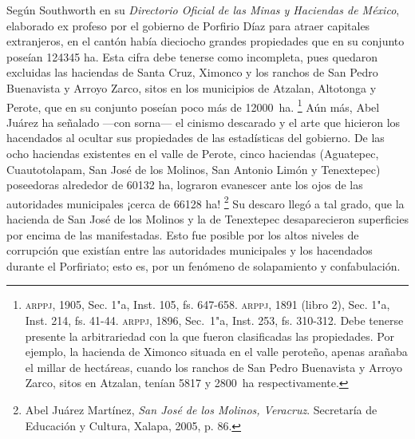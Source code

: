 \documentclass[14pt,twoside,final]{extbook} %
\let\oldfootnote\footnote
\renewcommand\footnote[1]{%
\oldfootnote{\hspace{1mm}#1}}
\begin{document}
Según Southworth en su \emph{Directorio Oficial de las Minas y Haciendas de México}, elaborado ex profeso por el gobierno de Porfirio Díaz para atraer capitales extranjeros, en el cantón había dieciocho grandes propiedades que en su conjunto poseían 124345 ha. Esta cifra debe tenerse como incompleta, pues quedaron excluidas las haciendas de Santa Cruz, Ximonco y los ranchos de San Pedro Buenavista y Arroyo Zarco, sitos en los municipios de Atzalan, Altotonga y Perote, que en su conjunto poseían poco más de 12000~ha.\footnote{\textsc{arppj}, 1905, Sec. 1"a, Inst. 105, fs. 647-658. \textsc{arppj}, 1891 (libro 2), Sec. 1"a, Inst. 214, fs. 41-44. \textsc{arppj}, 1896, Sec.~1"a, Inst. 253, fs. 310-312. Debe tenerse presente la arbitrariedad con la que fueron clasificadas las propiedades. Por ejemplo, la hacienda de Ximonco situada en el valle peroteño, apenas arañaba el millar de hectáreas, cuando los ranchos de San Pedro Buenavista y Arroyo Zarco, sitos en Atzalan, tenían 5817 y 2800~ha respectivamente.} Aún más, Abel Juárez ha señalado ---con sorna--- el cinismo descarado y el arte que hicieron los hacendados al ocultar sus propiedades de las estadísticas del gobierno. De las ocho haciendas existentes en el valle de Perote, cinco haciendas (Aguatepec, Cuautotolapam, San José de los Molinos, San Antonio Limón y Tenextepec) poseedoras alrededor de 60132 ha, lograron evanescer ante los ojos de las autoridades municipales ¡cerca de 66128 ha!\footnote{Abel Juárez Martínez, \emph{San José de los Molinos, Veracruz}. Secretaría de Educación y Cultura, Xalapa, 2005, p. 86.} Su descaro llegó a tal grado, que la hacienda de San José de los Molinos y la de Tenextepec desaparecieron superficies por encima de las manifestadas. Esto fue posible por los altos niveles de corrupción que existían entre las autoridades municipales y los hacendados durante el Porfiriato; esto es, por un fenómeno de solapamiento y confabulación.
\end{document}
